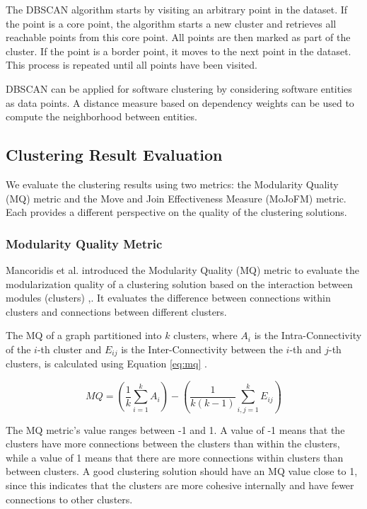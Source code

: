\documentclass{ieeeaccess}
\begin{document}
The DBSCAN algorithm starts by visiting an arbitrary point in the dataset. If the point is a core point, the algorithm starts a new cluster and retrieves all reachable points from this core point. All points are then marked as part of the cluster. If the point is a border point, it moves to the next point in the dataset. This process is repeated until all points have been visited.

DBSCAN can be applied for software clustering by considering software entities as data points. A distance measure based on dependency weights can be used to compute the neighborhood between entities.

\subsection{Clustering Result Evaluation}
\label{subsec:evaluation_def}

We evaluate the clustering results using two metrics: the Modularity Quality (MQ) metric and the Move and Join Effectiveness Measure (MoJoFM) metric. Each provides a different perspective on the quality of the clustering solutions.

\subsubsection{Modularity Quality Metric}
\label{subsec:mq}

Mancoridis et al. introduced the Modularity Quality (MQ) metric to evaluate the modularization quality of a clustering solution based on the interaction between modules (clusters) \cite{b101},\cite{b10}. It evaluates the difference between connections within clusters and connections between different clusters.

The MQ of a graph partitioned into \( k \) clusters, where \( A_i \) is the Intra-Connectivity of the \( i \)-th cluster and \( E_{ij} \) is the Inter-Connectivity between the \( i \)-th and \( j \)-th clusters, is calculated using Equation \eqref{eq:mq} \cite{b2}.

\begin{equation}
MQ = \left( \frac{1}{k} \sum_{i=1}^{k} A_i \right) - \left( \frac{1}{k(k-1)} \sum_{i,j=1}^{k} E_{ij} \right)
\label{eq:mq}
\end{equation}

The MQ metric's value ranges between -1 and 1. A value of -1 means that the clusters have more connections between the clusters than within the clusters, while a value of 1 means that there are more connections within clusters than between clusters. A good clustering solution should have an MQ value close to 1, since this indicates that the clusters are more cohesive internally and have fewer connections to other clusters.
\end{document}
